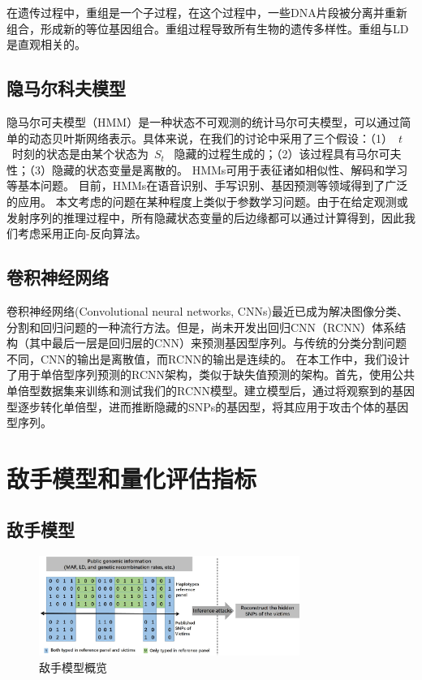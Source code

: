 在遗传过程中，重组是一个子过程，在这个过程中，一些DNA片段被分离并重新组合，形成新的等位基因组合。重组过程导致所有生物的遗传多样性。重组与LD是直观相关的。

\subsection{隐马尔科夫模型}

隐马尔可夫模型（HMM）\cite{rabiner1989tutorial,stamp2004revealing}是一种状态不可观测的统计马尔可夫模型，可以通过简单的动态贝叶斯网络表示。具体来说，在我们的讨论中采用了三个假设：（1）~$t$~时刻的状态是由某个状态为~$S_t$~ 隐藏的过程生成的；（2）该过程具有马尔可夫性；（3）隐藏的状态变量是离散的。
HMMs可用于表征诸如相似性、解码和学习等基本问题。 目前，HMMs在语音识别\cite{rabiner1989tutorial}、手写识别\cite{hu1996hmm}、基因预测\cite{durbin1998biological}等领域得到了广泛的应用。
本文考虑的问题在某种程度上类似于参数学习问题。由于在给定观测或发射序列的推理过程中，所有隐藏状态变量的后边缘都可以通过计算得到，因此我们考虑采用正向-反向算法。

\subsection{卷积神经网络}

卷积神经网络(Convolutional neural networks, CNNs)\cite{long2015fully,scutti2018what}最近已成为解决图像分类、分割和回归问题的一种流行方法。但是，尚未开发出回归CNN（RCNN）体系结构（其中最后一层是回归层的CNN）来预测基因型序列。与传统的分类分割问题不同，CNN的输出是离散值\cite{scutti2018what}，而RCNN的输出是连续的。
在本工作中，我们设计了用于单倍型序列预测的RCNN架构，类似于缺失值预测的架构。首先，使用公共单倍型数据集来训练和测试我们的RCNN模型。建立模型后，通过将观察到的基因型逐步转化单倍型，进而推断隐藏的SNPs的基因型，将其应用于攻击个体的基因型序列。


\section{敌手模型和量化评估指标}\label{sec:adver}

\subsection{敌手模型}
\begin{figure}
	\centering
	\includegraphics[width = 8.5cm]{./figures/Fig2-adversary-model.eps}
	\caption{敌手模型概览}
	\label{fig:adversary-model}
\end{figure}


